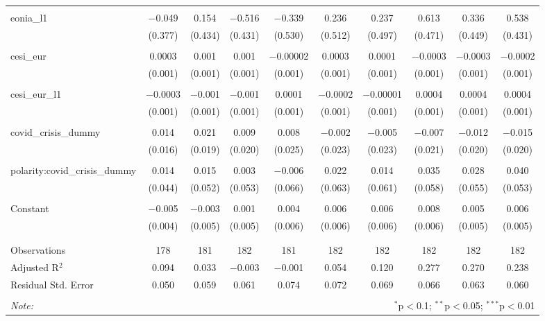 \begin{table}[!htbp]
\begin{adjustbox}{width=1.25\textwidth}
\begin{tabular}{@{\extracolsep{5pt}}lccccccccc}
  & & & & & & & & & \\ 
 eonia\_l1 & $-$0.049 & 0.154 & $-$0.516 & $-$0.339 & 0.236 & 0.237 & 0.613 & 0.336 & 0.538 \\ 
  & (0.377) & (0.434) & (0.431) & (0.530) & (0.512) & (0.497) & (0.471) & (0.449) & (0.431) \\ 
  & & & & & & & & & \\ 
 cesi\_eur & 0.0003 & 0.001 & 0.001 & $-$0.00002 & 0.0003 & 0.0001 & $-$0.0003 & $-$0.0003 & $-$0.0002 \\ 
  & (0.001) & (0.001) & (0.001) & (0.001) & (0.001) & (0.001) & (0.001) & (0.001) & (0.001) \\ 
  & & & & & & & & & \\ 
 cesi\_eur\_l1 & $-$0.0003 & $-$0.001 & $-$0.001 & 0.0001 & $-$0.0002 & $-$0.00001 & 0.0004 & 0.0004 & 0.0004 \\ 
  & (0.001) & (0.001) & (0.001) & (0.001) & (0.001) & (0.001) & (0.001) & (0.001) & (0.001) \\ 
  & & & & & & & & & \\ 
 covid\_crisis\_dummy & 0.014 & 0.021 & 0.009 & 0.008 & $-$0.002 & $-$0.005 & $-$0.007 & $-$0.012 & $-$0.015 \\ 
  & (0.016) & (0.019) & (0.020) & (0.025) & (0.023) & (0.023) & (0.021) & (0.020) & (0.020) \\ 
  & & & & & & & & & \\ 
 polarity:covid\_crisis\_dummy & 0.014 & 0.015 & 0.003 & $-$0.006 & 0.022 & 0.014 & 0.035 & 0.028 & 0.040 \\ 
  & (0.044) & (0.052) & (0.053) & (0.066) & (0.063) & (0.061) & (0.058) & (0.055) & (0.053) \\ 
  & & & & & & & & & \\ 
 Constant & $-$0.005 & $-$0.003 & 0.001 & 0.004 & 0.006 & 0.006 & 0.008 & 0.005 & 0.006 \\ 
  & (0.004) & (0.005) & (0.005) & (0.006) & (0.006) & (0.006) & (0.006) & (0.005) & (0.005) \\ 
  & & & & & & & & & \\ 
\hline \\[-1.8ex] 
Observations & 178 & 181 & 182 & 181 & 182 & 182 & 182 & 182 & 182 \\ 
Adjusted R$^{2}$ & 0.094 & 0.033 & $-$0.003 & $-$0.001 & 0.054 & 0.120 & 0.277 & 0.270 & 0.238 \\ 
Residual Std. Error & 0.050 & 0.059 & 0.061 & 0.074 & 0.072 & 0.069 & 0.066 & 0.063 & 0.060 \\ 
\hline 
\hline \\[-1.8ex] 
\textit{Note:}  & \multicolumn{9}{r}{$^{*}$p$<$0.1; $^{**}$p$<$0.05; $^{***}$p$<$0.01} \\ 
\end{tabular} 
\end{adjustbox} 
\end{table} 

